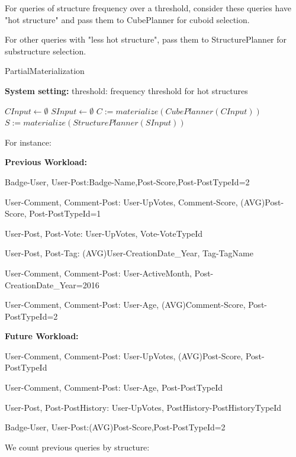 For queries of structure frequency over a threshold, consider these queries have "hot structure" and pass them to CubePlanner for cuboid selection. 

For other queries with "less hot structure", pass them to StructurePlanner for substructure selection. 

\begin{algorithm}[H]
	\caption{PartialMaterialization}
	\LinesNumbered
	\textbf{System setting:} threshold: frequency threshold for hot structures\\ 
	
	$CInput \gets \emptyset$ \;
	$SInput \gets \emptyset$ \;
	$C:=materialize(CubePlanner(CInput))$ \;
	$S:=materialize(StructurePlanner(SInput))$\;
\end{algorithm}
\clearpage

For instance:

\textbf{Previous Workload:}

Badge-User, User-Post:Badge-Name,Post-Score,Post-PostTypeId=2

User-Comment, Comment-Post: User-UpVotes, Comment-Score, (AVG)Post-Score, Post-PostTypeId=1

User-Post, Post-Vote: User-UpVotes, Vote-VoteTypeId

User-Post, Post-Tag: (AVG)User-CreationDate_Year, Tag-TagName

User-Comment, Comment-Post: User-ActiveMonth, Post-CreationDate_Year=2016

User-Comment, Comment-Post: User-Age, (AVG)Comment-Score, Post-PostTypeId=2

\textbf{Future Workload:}

User-Comment, Comment-Post: User-UpVotes, (AVG)Post-Score, Post-PostTypeId

User-Comment, Comment-Post: User-Age, Post-PostTypeId

User-Post, Post-PostHistory: User-UpVotes, PostHistory-PostHistoryTypeId

Badge-User, User-Post:(AVG)Post-Score,Post-PostTypeId=2



We count previous queries by structure:

